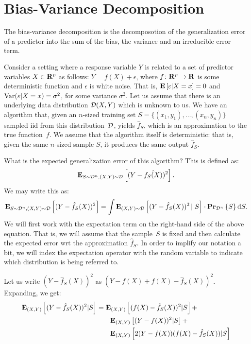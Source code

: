 \chapter{Bias-Variance Decomposition}

The bias-variance decomposition is the decomposotion of the generalization 
error of a predictor into the sum of the bias, the variance and an irreducible 
error term. 

Consider a setting where a response variable $Y$ is related to a set of 
predictor variables $X \in \mathbf{R}^p$ as follows: $Y = f(X) + \epsilon$, where 
$f \colon \mathbf{R}^p \rightarrow \mathbf{R}$ is some deterministic function and 
$\epsilon$ is white noise. That is, $\mathbf{E} \left [ \varepsilon \vert X = x \right ] = 0$ and 
$\text{Var} (\varepsilon \vert X = x) = \sigma^2$, for some variance $\sigma^2$. Let us 
assume that there is an underlying data distribution $\mathcal{D} (X, Y)$ which is 
unknown to us. We have an algorithm that, given an $n$-sized training set 
$S = \{ (x_1, y_1), \ldots, (x_n, y_n) \}$ sampled iid from this distribution~$\mathcal{D}$, 
yields $\hat{f}_S$, which is an approximation to the true function~$f$. 
We assume that the algorithm itself is deterministic: that is, given the same 
$n$-sized sample $S$, it produces the same output $\hat{f}_S$. 

What is the expected generalization error of this algorithm? This is defined 
as:
\begin{equation}
    \mathbf{E}_{S \sim \mathcal{D}^n, (X, Y) \sim \mathcal{D}} \left [ (Y - \hat{f_S(X)})^2 \right ].
\end{equation}
We may write this as:
\begin{equation} \label{eqn:basic_integral}
    \mathbf{E}_{S \sim \mathcal{D}^n, (X, Y) \sim \mathcal{D}} \left [ (Y - \hat{f}_S(X))^2 \right ] = 
    \int \mathbf{E}_{(X, Y) \sim \mathcal{D}} \left [ (Y - \hat{f}_S(X))^2 \left \vert \right . S \right ] 
    \cdot \mathbf{Pr}_{\mathcal{D}^n} \left \{ S \right \} \text{d} S.
\end{equation}
We will first work with the expectation term on the right-hand side of the above 
equation. That is, we will assume that the sample~$S$ is fixed and then calculate 
the expected error wrt the approximation $\hat{f}_S$. In order to implify our 
notation a bit, we will index the expectation operator with the random variable
to indicate which distribution is being referred to.  

Let us write $(Y - \hat{f}_S(X))^2$ as $(Y - f(X) + f(X) - \hat{f}_S(X))^2$. 
Expanding, we get:
\begin{equation}\label{eqn:break_up}
\begin{split}
    \mathbf{E}_{(X, Y)} \left [ (Y - \hat{f}_S(X))^2 \vert S \right ] & = 
    \mathbf{E}_{(X, Y)} \left [ (f(X) - \hat{f}_S(X))^2 \vert S \right ] + \\ 
    & \quad \quad \mathbf{E}_{(X, Y)} \left [ (Y - f(X))^2 \vert S \right ] + \\
    & \quad \quad \mathbf{E}_{(X, Y)} \left [ 2 (Y - f(X)) (f(X) - \hat{f}_S(X)) \vert S \right ]
\end{split}
\end{equation}

